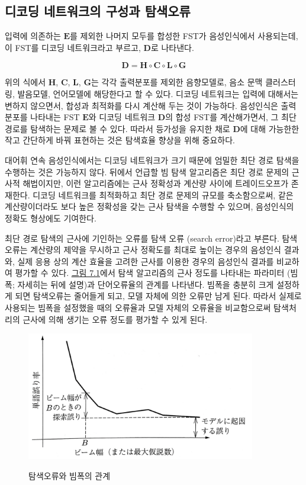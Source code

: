 \documentclass[../main.tex]{subfiles}
\begin{document}
\subsection{디코딩 네트워크의 구성과 탐색오류}

입력에 의존하는 $\bm{E}$를 제외한 나머지 모두를 합성한 FST가 음성인식에서 사용되는데, 이 FST를 디코딩 네트워크라고 부르고, $\bm{D}$로 나타낸다. 

\begin{equation}
    \bm{D} = \bm{H} \circ \bm{C} \circ \bm{L} \circ \bm{G}
\end{equation}

위의 식에서 $\bm{H}$, $\bm{C}$, $\bm{L}$, $\bm{G}$는 각각 출력분포를 제외한 음향모델로, 음소 문맥 클러스터링, 발음모델, 언어모델에 해당한다고 할 수 있다. 
디코딩 네트워크는 입력에 대해서는 변하지 않으면서, 합성과 최적화를 다시 계산해 두는 것이 가능하다. 
음성인식은 출력분포를 나타내는 FST $\bm{E}$와 디코딩 네트워크 $\bm{D}$의 합성 FST를 계산해가면서, 그 최단 경로를 탐색하는 문제로 불 수 있다. 
따라서 등가성을 유지한 채로 $\bm{D}$에 대해 가능한한 작고 간단하게 바꿔 표현하는 것은 탐색효율 향상을 위해 중요하다. 

대어휘 연속 음성인식에서는 디코딩 네트워크가 크기 때문에 엄밀한 최단 경로 탐색을 수행하는 것은 가능하지 않다. 
뒤에서 언급할 빔 탐색 알고리즘은 최단 경로 문제의 근사적 해법이지만, 이런 알고리즘에는 근사 정확성과 계산량 사이에 트레이드오프가 존재한다. 
디코딩 네트워크를 최적화하고 최단 경로 문제의 규모를 축소함으로써, 같은 계산량이더라도 보다 높은 정확성을 갖는 근사 탐색을 수행할 수 있으며, 음성인식의 정확도 형상에도 기여한다. 

최단 경로 탐색의 근사에 기인하는 오류를 탐색 오류 (search error)라고 부른다. 
탐색 오류는 계산량의 제약을 무시하고 근사 정확도를 최대로 높이는 경우의 음성인식 결과와, 실제 응용 상의 계산 효율을 고려한 근사를 이용한 경우의 음성인식 결과를 비교하여 평가할 수 있다. 
\hyperref[fig:7_1]{그림 7.1}에서 탐색 알고리즘의 근사 정도를 나타내는 파라미터 (빔폭; 자세히는 뒤에 설명)과 단어오류율의 관계를 나타낸다. 
빔폭을 충분히 크게 설정하게 되면 탐색오류는 줄어들게 되고, 모델 자체에 의한 오류만 남게 된다. 
따라서 실제로 사용되는 빔폭을 설정했을 때의 오류율과 모델 자체의 오류율을 비교함으로써 탐색처리의 근사에 의해 생기는 오류 정도를 평가할 수 있게 된다. 

\begin{figure}[h]
    \centering
    \includegraphics[width=10cm]{../figures/fig7_1_orig}\label{fig:7_1}
    \caption{탐색오류와 빔폭의 관계}
\end{figure}
\end{document}
